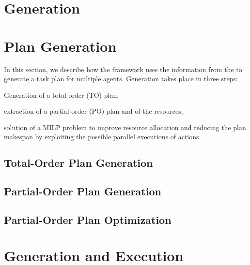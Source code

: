 
\section{\Kbase Generation}\label{sec:kb}


\section{Plan Generation}\label{sec:plangen}
In this section, we describe how the framework uses the information from the \kb to generate a task plan for multiple agents.
Generation takes place in three steps: 
\begin{enumerate*}
    \item Generation of a total-order (TO) plan, 
    \item extraction of a partial-order (PO) plan and of the resources, 
    \item solution of a MILP problem to improve resource allocation and reducing the plan makespan by exploiting the possible parallel executions of actions.
\end{enumerate*}



\subsection{Total-Order Plan Generation}\label{ssec:toplangen}

\subsection{Partial-Order Plan Generation}\label{ssec:poplangen}

\subsection{Partial-Order Plan Optimization}\label{ssec:poplanopt}


\section{\Btree Generation and Execution}\label{sec:bt}

